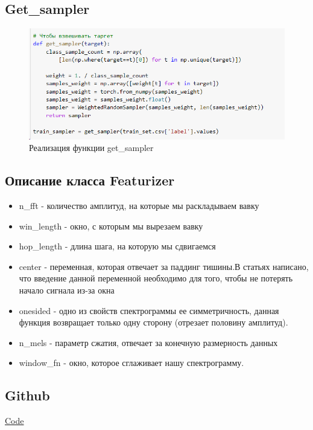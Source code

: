 \documentclass[a4paper,12pt]{article}
\begin{document}
 	\subsection{Get\_sampler}\label{getsampler}
 	\begin{figure}[H]
 		\centering
 		\includegraphics[width=0.7\linewidth]{Image/Get_sampler}
 		\caption{Реализация функции get\_sampler}
 		\label{fig:getsampler}
 	\end{figure}
 	
 	
 	\subsection{Описание класса Featurizer}\label{Featurizer}
 		\begin{itemize}
 		\item n\_fft - количество амплитуд, на которые мы раскладываем вавку
 		\item win\_length - окно, с которым мы вырезаем вавку
 		\item hop\_length - длина шага, на которую мы сдвигаемся
 		\item center - переменная, которая отвечает за паддинг тишины.В статьях написано, что введение данной переменной необходимо для того, чтобы не потерять начало сигнала из-за окна
 		\item onesided - одно из свойств спектрограммы ее симметричность, данная функция возвращает только одну сторону (отрезает половину амплитуд).
 		\item n\_mels - параметр сжатия, отвечает за конечную размерность данных
 		\item window\_fn - окно, которое сглаживает нашу спектрограмму.
 	\end{itemize}
 
 	\subsection{Github}
 	\begin{spacing}{2}
 		{\Large
 			\href{https://github.com/Vladimir-Dimitrov-Ngu/Audio_DL/tree/master/Work/Code}{Code}}
 	
 	\end{spacing}
 	
\end{document}
